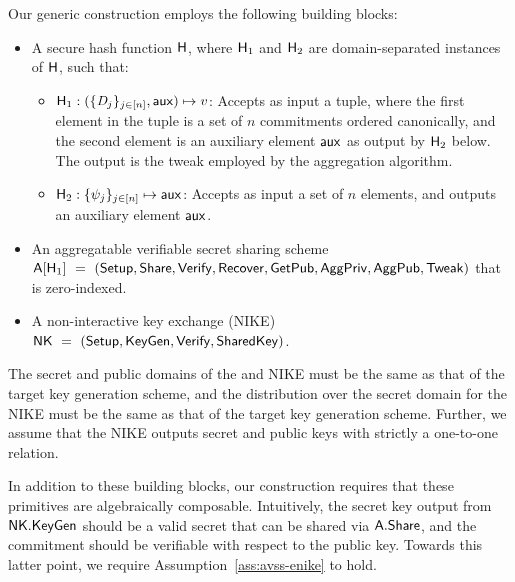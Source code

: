 Our generic construction employs the following building blocks:

\begin{itemize}
  \item A secure hash function $\mathsf{H}$, where $\mathsf{H}_1$ and $\mathsf{H}_2$ are domain-separated instances of $\mathsf{H}$, such that:
\begin{itemize}
  \item $\mathsf{H}_1: (\{\textit{D}_j \}_{j \in [n]}, \mathsf{aux}) \mapsto
    v$: Accepts as input a tuple, where the first element in the tuple is a set of $n$ \AVSS commitments ordered canonically,
    and the second element is an auxiliary element $\mathsf{aux}$ as output by $\mathsf{H}_2$ below.
    The output is the tweak employed by the \AVSS aggregation algorithm.
  \item $\mathsf{H}_2: \{ \psi_j \}_{j \in [n]} \mapsto \mathsf{aux}$: Accepts as input a set of $n$ elements,
  and outputs an auxiliary element $\mathsf{aux}$.
\end{itemize}
  \item An aggregatable verifiable secret sharing scheme
    $\mathsf{A}[\mathsf{H}_1]~=~(\mathsf{Setup},
    \mathsf{Share},\mathsf{Verify},\allowbreak\mathsf{Recover},\allowbreak\mathsf{GetPub},
    \mathsf{AggPriv}, \mathsf{AggPub},\mathsf{Tweak})$ that is zero-indexed.
  \item A non-interactive key exchange (NIKE) $\mathsf{NK}~=~(\mathsf{Setup}, \mathsf{KeyGen},\mathsf{Verify},\mathsf{SharedKey})$.
\end{itemize}

The secret and public domains of the \AVSS and NIKE must be the same as that of the target key generation scheme,
and the distribution over the secret domain for the NIKE must be the same as that of the target key generation scheme.
Further, we assume that the NIKE outputs secret and public keys with strictly a one-to-one relation.

In addition to these building blocks,
our construction requires that these primitives are algebraically composable.
Intuitively,
the secret key output from $\mathsf{NK}.\mathsf{KeyGen}$ should be a valid secret that can be shared via $\mathsf{A}.\mathsf{Share}$,
and the \AVSS commitment should be verifiable with respect to the public \ENIKE key.
Towards this latter point,
we require Assumption~\ref{ass:avss-enike} to hold.

